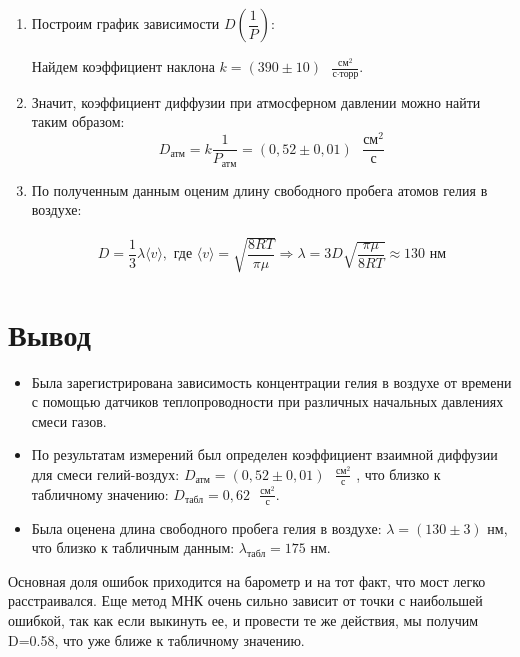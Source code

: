 \documentclass[a4paper,12pt]{article}
\theoremstyle{definition}
\begin{document}
\begin{enumerate}
			\newpage 
			
			\item Построим график зависимости $D\left(\dfrac{1}{P}\right)$:
			
			\begin{figure}[H]
			\end{figure}

			Найдем коэффициент наклона $k = (390\pm10)\text{ } \frac{\text{см}^2}{\text{с}\cdot\text{торр}}$. 
			
			\item Значит, коэффициент диффузии при атмосферном давлении можно найти таким образом:\[D_\text{атм} = k\dfrac{1}{P_\text{атм}} = (0,52\pm0,01)\text{ } \frac{\text{см}^2}{\text{с}}\]
			
			\item По полученным данным оценим длину свободного пробега атомов гелия в воздухе:
			
			\begin{align}
				D=\dfrac{1}{3}\lambda\langle v\rangle,\text{ где } \langle v \rangle = \sqrt{\dfrac{8RT}{\pi \mu}} \Rightarrow \lambda = 3D\sqrt{\dfrac{\pi \mu}{8RT}} \approx 130\text{ нм}
			\end{align}
	
		\end{enumerate}
	
		
	\section{Вывод}
		
		\begin{itemize}
			\item Была зарегистрирована зависимость концентрации гелия в воздухе от времени с помощью датчиков теплопроводности при различных начальных давлениях смеси газов.
			\item По результатам измерений был определен коэффициент взаимной диффузии для смеси гелий-воздух: $D_\text{атм} = (0,52\pm0,01)\text{ } \frac{\text{см}^2}{\text{с}}$ , что близко к табличному значению: $D_\text{табл} = 0,62\text{ } \frac{\text{см}^2}{\text{с}}$. 
			
			\item Была оценена длина свободного пробега гелия в воздухе: $\lambda = (130\pm 3)\text{ нм}$, что близко к табличным данным: $\lambda_\text{табл} = 175\text{ нм}$. 
		\end{itemize}
	
		Основная доля ошибок приходится на барометр и на тот факт, что мост легко расстраивался. Еще метод МНК очень сильно зависит от точки с наибольшей ошибкой, так как если выкинуть ее, и провести те же действия, мы получим D=0.58, что уже ближе к табличному значению.
		
	
\end{document}
